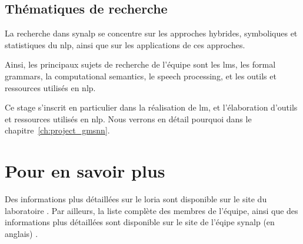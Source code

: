 \subsection{Thématiques de recherche}
La recherche dans \gls{synalp} se concentre sur les approches hybrides, symboliques et statistiques du \gls{nlp}, ainsi que sur les applications de ces approches.

Ainsi, les principaux sujets de recherche de l'équipe sont les \glspl{lm}, les \gls{formal grammars}, la \gls{computational semantics}, le \gls{speech processing}, et les outils et ressources utilisés en \gls{nlp}.

Ce stage s'inscrit en particulier dans la réalisation de \gls{lm}, et l'élaboration d'outils et ressources utilisés en \gls{nlp}. Nous verrons en détail pourquoi dans le chapitre~\ref{ch:project_gmsnn}.

\section{Pour en savoir plus}
Des informations plus détaillées sur le \gls{loria} sont disponible sur {le site du laboratoire \autocite{about_loria}}.
Par ailleurs, la liste complète des membres de l'équipe, ainsi que des informations plus détaillées sont disponible sur {le site de l'éqipe \gls{synalp} (en anglais) \autocite{about_synalp}}.